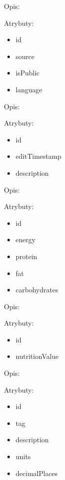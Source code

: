 \begin{enumerate}[label={\textbf{KAT/\protect\threedigits{\theenumi}}}, wide, labelwidth=!, labelindent=0pt, series=reqs]
     \label{kat:Product}

    Opis: \lipsum[1]
    \par
    Atrybuty:
    \begin{itemize}
        \item id
        \item source
        \item isPublic
        \item language
    \end{itemize}

     \label{kat:ProductVersion}

    Opis: \lipsum[1]
    \par
    Atrybuty:
    \begin{itemize}
        \item id
        \item editTimestamp
        \item description
    \end{itemize}

     \label{kat:ProductBasicNutritionData}

    Opis: \lipsum[1]
    \par
    Atrybuty:
    \begin{itemize}
        \item id
        \item energy
        \item protein
        \item fat
        \item carbohydrates
    \end{itemize}

     \label{kat:NutritionData}

    Opis: \lipsum[1]
    \par
    Atrybuty:
    \begin{itemize}
        \item id
        \item nutritionValue
    \end{itemize}

     \label{kat:NutritionDefinition}

    Opis: \lipsum[1]
    \par
    Atrybuty:
    \begin{itemize}
        \item id
        \item tag
        \item description
        \item units
        \item decimalPlaces
    \end{itemize}


\end{enumerate}
